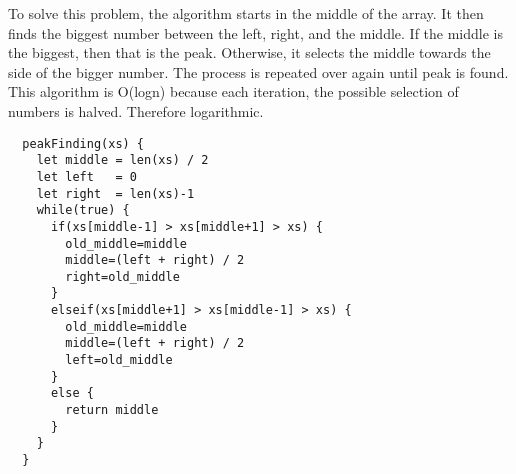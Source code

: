 To solve this problem, the algorithm starts in the middle of the array. It then finds the biggest number between the left, right, and the middle. If the middle is the biggest, then that is the peak. Otherwise, it selects the middle towards the side of the bigger number. The process is repeated over again until peak is found.
This algorithm is O(logn) because each iteration, the possible selection of numbers is halved. Therefore logarithmic.

\begin{verbatim}
  peakFinding(xs) {
    let middle = len(xs) / 2
    let left   = 0
    let right  = len(xs)-1
    while(true) {
      if(xs[middle-1] > xs[middle+1] > xs) {
        old_middle=middle
        middle=(left + right) / 2
        right=old_middle
      }
      elseif(xs[middle+1] > xs[middle-1] > xs) {
        old_middle=middle
        middle=(left + right) / 2
        left=old_middle
      }
      else {
        return middle
      }
    }
  }
\end{verbatim}

